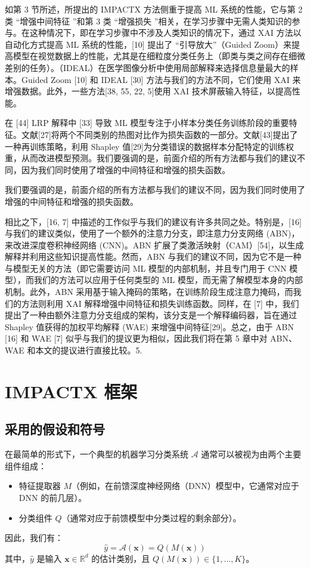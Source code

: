 \documentclass[12pt, a4paper]{ctexart} %
\begin{document}
如第 3 节所述，所提出的 IMPACTX 方法侧重于提高 ML 系统的性能，它与第 2 类 “增强中间特征 ”和第 3 类 “增强损失 ”相关，在学习步骤中无需人类知识的参与。在这种情况下，即在学习步骤中不涉及人类知识的情况下，通过 XAI 方法以自动化方式提高 ML 系统的性能，[10] 提出了 “引导放大”（Guided Zoom）来提高模型在视觉数据上的性能，尤其是在细粒度分类任务上（即类与类之间存在细微差别的任务）。（IDEAL）在医学图像分析中使用局部解释来选择信息量最大的样本。Guided Zoom [10] 和 IDEAL [30] 方法与我们的方法不同，它们使用 XAI 来增强数据。此外，一些方法[38, 55, 22, 5]使用 XAI 技术屏蔽输入特征，以提高性能。

在 [44] LRP 解释中 [33] 导致 ML 模型专注于小样本分类任务训练阶段的重要特征。文献[27]将两个不同类别的热图对比作为损失函数的一部分。文献[43]提出了一种再训练策略，利用 Shapley 值[29]为分类错误的数据样本分配特定的训练权重，从而改进模型预测。我们要强调的是，前面介绍的所有方法都与我们的建议不同，因为我们同时使用了增强的中间特征和增强的损失函数。

我们要强调的是，前面介绍的所有方法都与我们的建议不同，因为我们同时使用了增强的中间特征和增强的损失函数。

相比之下，[16, 7] 中描述的工作似乎与我们的建议有许多共同之处。特别是，[16] 与我们的建议类似，使用了一个额外的注意力分支，即注意力分支网络 (ABN)，来改进深度卷积神经网络 (CNN)。ABN 扩展了类激活映射（CAM）[54]，以生成解释并利用这些知识提高性能。然而，ABN 与我们的建议不同，因为它不是一种与模型无关的方法（即它需要访问 ML 模型的内部机制，并且专门用于 CNN 模型），而我们的方法可以应用于任何类型的 ML 模型，而无需了解模型本身的内部机制。此外，ABN 采用基于输入掩码的策略，在训练阶段生成注意力掩码，而我们的方法则利用 XAI 解释增强中间特征和损失训练函数。同样，在 [7] 中，我们提出了一种由额外注意力分支组成的架构，该分支是一个解释编码器，旨在通过 Shapley 值获得的加权平均解释 (WAE) 来增强中间特征[29]。总之，由于 ABN [16] 和 WAE [7] 似乎与我们的提议更为相似，因此我们将在第 5 章中对 ABN、WAE 和本文的提议进行直接比较。5.

\section{IMPACTX 框架}
\subsection{采用的假设和符号}
在最简单的形式下，一个典型的机器学习分类系统 \( \mathcal{A} \) 通常可以被视为由两个主要组件组成：
\begin{itemize}
    \item 特征提取器 \( M \)（例如，在前馈深度神经网络（DNN）模型中，它通常对应于 DNN 的前几层）。
    \item 分类组件 \( Q \)（通常对应于前馈模型中分类过程的剩余部分）。
\end{itemize}
因此，我们有：
\[
\hat{y} = \mathcal{A}(\mathbf{x}) = Q(M(\mathbf{x}))
\]
其中，\( \hat{y} \) 是输入 \( \mathbf{x} \in \mathbb{R}^{d} \) 的估计类别，且 \( Q(M(\mathbf{x})) \in \{1, \dots, K\} \)。
\end{document}
